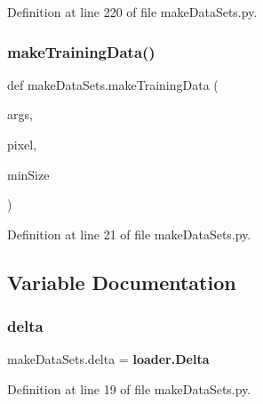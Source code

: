 Definition at line 220 of file make\+Data\+Sets.\+py.

\mbox{\label{namespacemake_data_sets_af3db37f2142f28fc530822aa2dbbbd72}} 
\subsubsection{make\+Training\+Data()}
{\footnotesize\ttfamily def make\+Data\+Sets.\+make\+Training\+Data (\begin{DoxyParamCaption}\item[{}]{args,  }\item[{}]{pixel,  }\item[{}]{min\+Size }\end{DoxyParamCaption})}



Definition at line 21 of file make\+Data\+Sets.\+py.



\subsection{Variable Documentation}
\mbox{\label{namespacemake_data_sets_a505d3e2b477c1ec48ebce9a41be80be3}} 
\subsubsection{delta}
{\footnotesize\ttfamily make\+Data\+Sets.\+delta = \textbf{ loader.\+Delta}}



Definition at line 19 of file make\+Data\+Sets.\+py.

